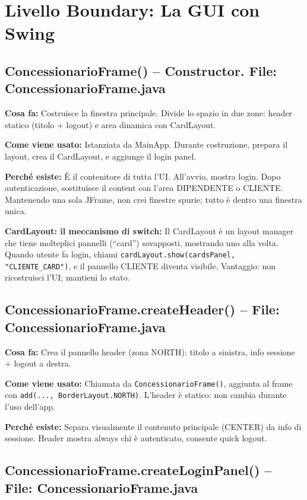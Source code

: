 \documentclass[12pt,a4paper]{article}
\begin{document}
\section{Livello Boundary: La GUI con Swing}

\subsection{ConcessionarioFrame() -- Constructor. File: ConcessionarioFrame.java}

\textbf{Cosa fa:}
Costruisce la finestra principale. Divide lo spazio in due zone: header statico (titolo + logout) e area dinamica con CardLayout.

\textbf{Come viene usato:}
Istanziata da MainApp. Durante costruzione, prepara il layout, crea il CardLayout, e aggiunge il login panel.

\textbf{Perché esiste:}
È il contenitore di tutta l'UI. All'avvio, mostra login. Dopo autenticazione, sostituisce il content con l'area DIPENDENTE o CLIENTE.
Mantenendo una sola JFrame, non crei finestre spurie; tutto è dentro una finestra unica.

\textbf{CardLayout: il meccanismo di switch:}
Il CardLayout è un layout manager che tiene molteplici pannelli (``card'') sovapposti, mostrando uno alla volta.
Quando utente fa login, chiami \texttt{cardLayout.show(cardsPanel, "CLIENTE\_CARD")}, e il pannello CLIENTE diventa visibile.
Vantaggio: non ricostruisci l'UI; mantieni lo stato.

\subsection{ConcessionarioFrame.createHeader() -- File: ConcessionarioFrame.java}

\textbf{Cosa fa:}
Crea il pannello header (zona NORTH): titolo a sinistra, info sessione + logout a destra.

\textbf{Come viene usato:}
Chiamata da \texttt{ConcessionarioFrame()}, aggiunta al frame con \texttt{add(..., BorderLayout.NORTH)}.
L'header è statico: non cambia durante l'uso dell'app.

\textbf{Perché esiste:}
Separa visualmente il contenuto principale (CENTER) da info di sessione.
Header mostra always chi è autenticato, consente quick logout.

\subsection{ConcessionarioFrame.createLoginPanel() -- File: ConcessionarioFrame.java}
\end{document}
